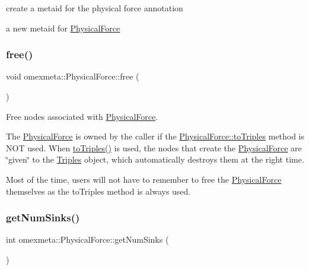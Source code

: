 create a metaid for the physical force annotation 

a new metaid for \hyperlink{classomexmeta_1_1PhysicalForce}{Physical\+Force} \mbox{\label{classomexmeta_1_1PhysicalForce_a41cd6c9904f3287bb8cbbab2b9d2ada3}} 
\subsubsection{\texorpdfstring{free()}{free()}}
{\footnotesize\ttfamily void omexmeta\+::\+Physical\+Force\+::free (\begin{DoxyParamCaption}{ }\end{DoxyParamCaption})}



Free nodes associated with \hyperlink{classomexmeta_1_1PhysicalForce}{Physical\+Force}. 

The \hyperlink{classomexmeta_1_1PhysicalForce}{Physical\+Force} is owned by the caller if the \hyperlink{classomexmeta_1_1PhysicalForce_a39dd511aee85130d07cb6ffb3f8e87f0}{Physical\+Force\+::to\+Triples} method is N\+OT used. When \hyperlink{classomexmeta_1_1PhysicalForce_a39dd511aee85130d07cb6ffb3f8e87f0}{to\+Triples()} is used, the nodes that create the \hyperlink{classomexmeta_1_1PhysicalForce}{Physical\+Force} are \char`\"{}given\char`\"{} to the \hyperlink{classomexmeta_1_1Triples}{Triples} object, which automatically destroys them at the right time.

Most of the time, users will not have to remember to free the \hyperlink{classomexmeta_1_1PhysicalForce}{Physical\+Force} themselves as the to\+Triples method is always used. \mbox{\label{classomexmeta_1_1PhysicalForce_a1135c75705b59afa7037bab313009534}} 
\subsubsection{\texorpdfstring{get\+Num\+Sinks()}{getNumSinks()}}
{\footnotesize\ttfamily int omexmeta\+::\+Physical\+Force\+::get\+Num\+Sinks (\begin{DoxyParamCaption}{ }\end{DoxyParamCaption})}



